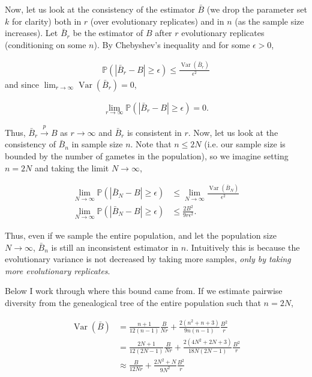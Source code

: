 \documentclass[11pt]{article}
\renewcommand{\P}{\mathbb{P}}
\DeclareMathOperator{\var}{Var}
\begin{document}
Now, let us look at the consistency of the estimator $\bar{B}$ (we drop the
parameter set $k$ for clarity) both in $r$ (over evolutionary replicates) and
in $n$ (as the sample size increases). Let $\bar{B}_r$ be the estimator of $B$
after $r$ evolutionary replicates (conditioning on some $n$). By Chebyshev's
inequality and for some $\epsilon > 0$,

\begin{align}
  \P\left(|\bar{B}_r - B| \ge \epsilon \right)  \le \frac{\var(\bar{B}_r)}{\epsilon^2}
\end{align}
%
and since $\lim_{r \to \infty} \var(\bar{B}_r) = 0$,

\begin{align}
  \lim_{r \to \infty} \P\left(|\bar{B}_r - B| \ge \epsilon \right)  = 0.
\end{align}

Thus, $\bar{B}_r \xrightarrow{p} B$ as $r \to \infty$ and $\bar{B}_r$ is
consistent in $r$. Now, let us look at the consistency of $\bar{B}_n$ in sample
size $n$. Note that $n \le 2N$ (i.e. our sample size is bounded by the number
of gametes in the population), so we imagine setting $n = 2N$ and taking the
limit $N \to \infty$,

\begin{align}
  \lim_{N \to \infty} \P\left(|\bar{B}_N - B| \ge \epsilon \right)  &\le \lim_{N \to \infty} \frac{\var(\bar{B}_N)}{\epsilon^2} \\
  \lim_{N \to \infty} \P\left(|\bar{B}_N - B| \ge \epsilon \right)  &\le \frac{2B^2}{9 r \epsilon^2}. \label{eq:bound}
\end{align}

Thus, even if we sample the entire population, and let the population size $N
\to \infty$, $\bar{B}_n$ is still an inconsistent estimator in $n$. Intuitively
this is because the evolutionary variance is not decreased by taking more
samples, \emph{only by taking more evolutionary replicates}.

Below I work through where this bound came from. If we estimate pairwise
diversity from the genealogical tree of the entire population such that $n =
2N$,

\begin{align}
  \var(\bar{B}) &= \frac{n + 1}{12(n-1)} \frac{B}{N r} + \frac{2(n^2 + n + 3)}{9n(n-1)} \frac{B^2}{r} \\
                &= \frac{2N + 1}{12(2N-1)} \frac{B}{N r} + \frac{2(4N^2 + 2N + 3)}{18N(2N-1)} \frac{B^2}{r} \\
                &\approx \frac{B}{12N r} + \frac{2N^2 + N}{9N^2} \frac{B^2}{r}
\end{align}
\end{document}
